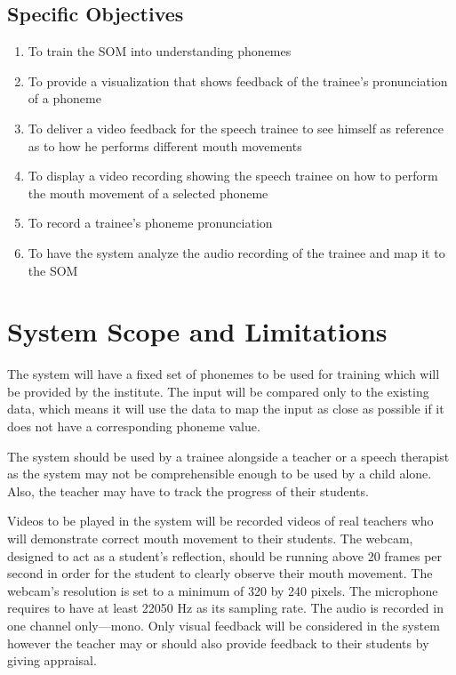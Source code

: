 \subsection{Specific Objectives}
\begin{enumerate}
\item To train the SOM into understanding phonemes
\item To provide a visualization that shows feedback of the trainee's pronunciation of a phoneme
\item To deliver a video feedback for the speech trainee to see himself as reference as to how he performs different mouth movements
\item To display a video recording showing the speech trainee on how to perform the mouth movement of a selected phoneme
\item To record a trainee's phoneme pronunciation
\item To have the system analyze the audio recording of the trainee and map it to the SOM
\end{enumerate}

\section{System Scope and Limitations}
The system will have a fixed set of phonemes to be used for training which will be provided by the institute. The input will be compared only to the existing data, which means it will use the data to map the input as close as possible if it does not have a corresponding phoneme value. 

The system should be used by a trainee alongside a teacher or a speech therapist as the system may not be comprehensible enough to be used by a child alone. Also, the teacher may have to track the progress of their students.

Videos to be played in the system will be recorded videos of real teachers who will demonstrate correct mouth movement to their students. The webcam, designed to act as a student's reflection, should be running above 20 frames per second in order for the student to clearly observe their mouth movement. The webcam's resolution is set to a minimum of 320 by 240 pixels. The microphone requires to have at least 22050 Hz as its sampling rate. The audio is recorded in one channel only---mono. Only visual feedback will be considered in the system however the teacher may or should also provide feedback to their students by giving appraisal.

